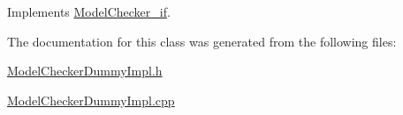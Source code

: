 Implements \hyperlink{class_model_checker__if_a36eada12fe9753f5c89099c572e27426}{Model\+Checker\+\_\+if}.



The documentation for this class was generated from the following files\+:\begin{DoxyCompactItemize}
\item 
\hyperlink{_model_checker_dummy_impl_8h}{Model\+Checker\+Dummy\+Impl.\+h}\item 
\hyperlink{_model_checker_dummy_impl_8cpp}{Model\+Checker\+Dummy\+Impl.\+cpp}\end{DoxyCompactItemize}
